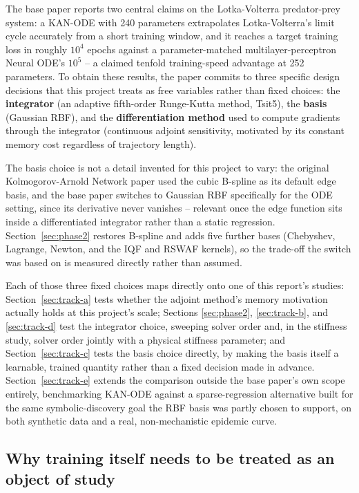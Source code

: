The base paper reports two central claims on the Lotka-Volterra
predator-prey system: a KAN-ODE with 240 parameters extrapolates
Lotka-Volterra's limit cycle accurately from a short training window, and it
reaches a target training loss in roughly $10^4$ epochs against a
parameter-matched multilayer-perceptron Neural ODE's $10^5$ -- a claimed
tenfold training-speed advantage at 252 parameters. To obtain these results,
the paper commits to three specific design decisions that this project
treats as free variables rather than fixed choices: the \textbf{integrator}
(an adaptive fifth-order Runge-Kutta method, Tsit5), the \textbf{basis}
(Gaussian RBF), and the \textbf{differentiation method} used to compute
gradients through the integrator (continuous adjoint sensitivity, motivated
by its constant memory cost regardless of trajectory length).

The basis choice is not a detail invented for this project to vary: the
original Kolmogorov-Arnold Network paper \cite{liu2024kan} used the cubic
B-spline as its default edge basis, and the base paper switches to Gaussian
RBF specifically for the ODE setting, since its derivative never vanishes --
relevant once the edge function sits inside a differentiated integrator
rather than a static regression. Section~\ref{sec:phase2} restores B-spline
and adds five further bases (Chebyshev, Lagrange, Newton, and the IQF and
RSWAF kernels), so the trade-off the switch was based on is measured
directly rather than assumed.

Each of those three fixed choices maps directly onto one of this report's
studies: Section~\ref{sec:track-a} tests whether the adjoint method's
memory motivation actually holds at this project's scale; Sections
\ref{sec:phase2}, \ref{sec:track-b}, and \ref{sec:track-d} test the
integrator choice, sweeping solver order and, in the stiffness study,
solver order jointly with a physical stiffness parameter; and
Section~\ref{sec:track-c} tests the basis choice directly, by making the
basis itself a learnable, trained quantity rather than a fixed decision made
in advance. Section~\ref{sec:track-e} extends the comparison outside the
base paper's own scope entirely, benchmarking KAN-ODE against a
sparse-regression alternative built for the same symbolic-discovery goal the
RBF basis was partly chosen to support, on both synthetic data and a real,
non-mechanistic epidemic curve.

\subsection{Why training itself needs to be treated as an object of study}

